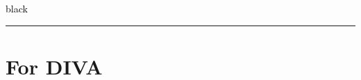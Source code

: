 \documentclass[english, biblatex, digitaloutput]{kththesis}
\begin{document}
\textcolor{black}{black} {\color{black} \rule{\linewidth}{1mm} }

\label{pg:lastPageofMainmatter}

\clearpage
\fancyhead{}  %
\section*{For DIVA}
\lstset{numbers=none} %
\end{document}
